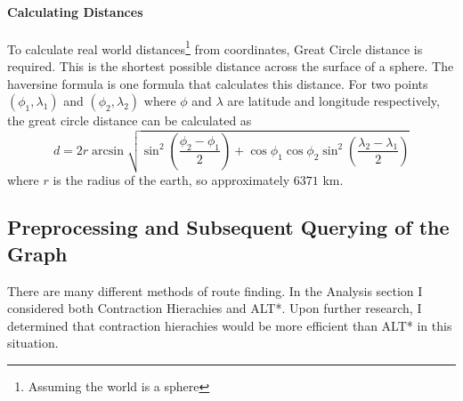 \documentclass[11pt,twoside,a4paper]{report}
\begin{document}
\paragraph{Calculating Distances}
To calculate real world distances\footnote{Assuming the world is a sphere} from coordinates, Great Circle distance is required. This is the shortest possible distance across the surface of a sphere. The haversine formula\cite{de1795memoria} is one formula that calculates this distance.
For two points $(\phi_1,\lambda_1)$ and $(\phi_2,\lambda_2)$ where $\phi$ and $\lambda$ are latitude and longitude respectively, the great circle distance can be calculated as
\[
d = 2r\arcsin\sqrt{\sin^2{(\frac{\phi_2-\phi_1}{2})}+\cos{\phi_1}\cos{\phi_2}\sin^2{(\frac{\lambda_2-\lambda_1}{2})}}
\]
where $r$ is the radius of the earth, so approximately $6371$ km.
\subsection{Preprocessing and Subsequent Querying of the Graph}
\label{contractiondesign}
There are many different methods of route finding\cite{travelplannervideo}. In the Analysis section I considered both Contraction Hierachies\cite{Geisberger2012} and ALT*. Upon further research, I determined that contraction hierachies would be more
efficient than ALT* in this situation. 
\end{document}
